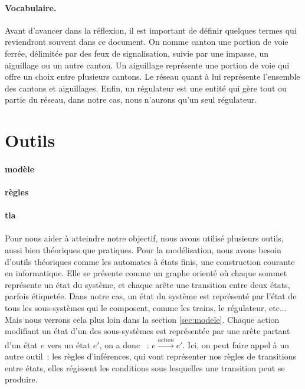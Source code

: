 \documentclass[oneside, a4paper, 11pt]{book}
\begin{document}
\paragraph{Vocabulaire.}
Avant d'avancer dans la réflexion, il est important de définir quelques termes qui reviendront souvent dans ce document. On nomme canton une portion de voie ferrée, délimitée par des feux de signalisation, suivie par une impasse, un aiguillage ou un autre canton. 
Un aiguillage représente une portion de voie qui offre un choix entre plusieurs cantons. Le réseau quant à lui représente l'ensemble des cantons et aiguillages. Enfin, un régulateur est une entité qui gère tout ou partie du réseau, dans notre cas, nous n'aurons qu'un seul régulateur. 

\section{Outils}

\paragraph{modèle}
\paragraph{règles}
\paragraph{tla}



\paragraph{}
Pour nous aider à atteindre notre objectif, nous avons utilisé plusieurs outils, aussi bien théoriques que pratiques.
Pour la modélisation, nous avons besoin d'outils théoriques comme les automates à états finis, une construction courante en informatique. Elle se présente comme un graphe orienté
où chaque sommet représente un état du système, et chaque arête une transition entre deux états, parfois étiquetée.
Dans notre cas, un état du système est représenté par l'état de tous les sous-systèmes qui le composent, comme les trains, le régulateur, etc... 
Mais nous verrons cela plus loin dans la section \ref{sec:modele}.
Chaque action modifiant un état d'un des sous-systèmes est représentée par une arête partant d'un état $e$ vers un état $e'$, on a donc ~: $e \xrightarrow{action} e'$.
Ici, on peut faire appel à un autre outil~: les règles d'inférences, qui vont représenter nos règles de transitions entre états, elles régissent les conditions sous lesquelles une transition peut se produire.
\end{document}
